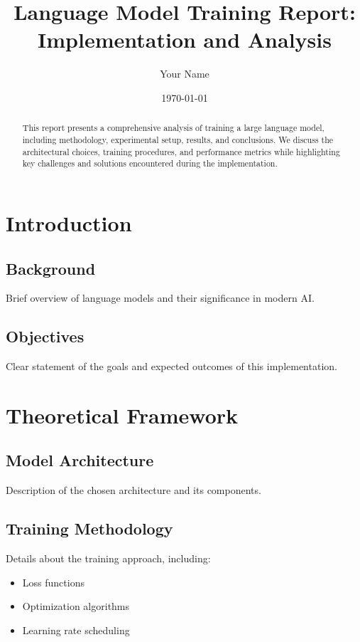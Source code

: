 \documentclass[12pt,a4paper]{article}
\title{\Large Language Model Training Report:\\
       Implementation and Analysis}
\author{Your Name}
\date{\today}
\begin{document}
\maketitle

\begin{abstract}
This report presents a comprehensive analysis of training a large language model, including methodology, experimental setup, results, and conclusions. We discuss the architectural choices, training procedures, and performance metrics while highlighting key challenges and solutions encountered during the implementation.
\end{abstract}

\tableofcontents

\section{Introduction}
\subsection{Background}
Brief overview of language models and their significance in modern AI.

\subsection{Objectives}
Clear statement of the goals and expected outcomes of this implementation.

\section{Theoretical Framework}
\subsection{Model Architecture}
Description of the chosen architecture and its components.

\subsection{Training Methodology}
Details about the training approach, including:
\begin{itemize}
    \item Loss functions
    \item Optimization algorithms
    \item Learning rate scheduling
\end{itemize}
\end{document}
